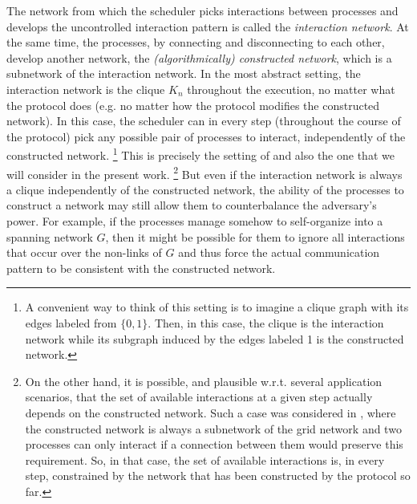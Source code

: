\documentclass[preprint]{elsarticle}
\begin{document}
The network from which the scheduler picks interactions between processes and develops the uncontrolled interaction pattern is called the \emph{interaction network}. At the same time, the processes, by connecting and disconnecting to each other, develop another network, the \emph{(algorithmically) constructed network}, which is a subnetwork of the interaction network. In the most abstract setting, the interaction network is the clique $K_n$ throughout the execution, no matter what the protocol does (e.g. no matter how the protocol modifies the constructed network). In this case, the scheduler can in every step (throughout the course of the protocol) pick any possible pair of processes to interact, independently of the constructed network. \footnote{A convenient way to think of this setting is to imagine a clique graph with its edges labeled from $\{0,1\}$. Then, in this case, the clique is the interaction network while its subgraph induced by the edges labeled 1 is the constructed network.} This is precisely the setting of \cite{MS14} and also the one that we will consider in the present work. \footnote{On the other hand, it is possible, and plausible w.r.t. several application scenarios, that the set of available interactions at a given step actually depends on the constructed network. Such a case was considered in \cite{Mi15}, where the constructed network is always a subnetwork of the grid network and two processes can only interact if a connection between them would preserve this requirement. So, in that case, the set of available interactions is, in every step, constrained by the network that has been constructed by the protocol so far.} But even if the interaction network is always a clique independently of the constructed network, the ability of the processes to construct a network may still allow them to counterbalance the adversary's power. For example, if the processes manage somehow to self-organize into a spanning network $G$, then it might be possible for them to ignore all interactions that occur over the non-links of $G$ and thus force the actual communication pattern to be consistent with the constructed network.
\end{document}
